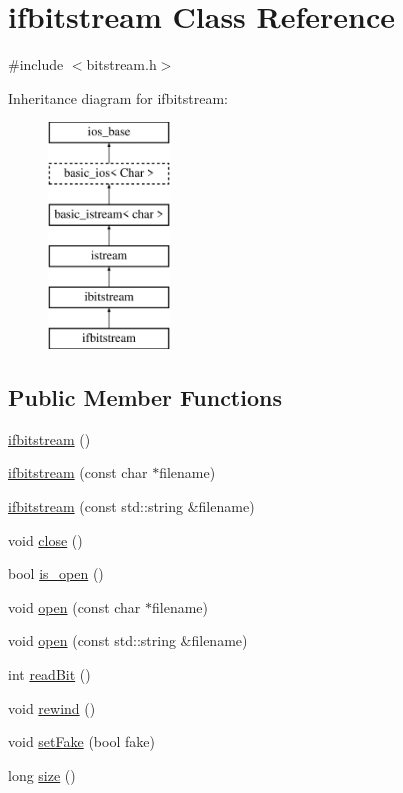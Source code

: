 \hypertarget{classifbitstream}{}\section{ifbitstream Class Reference}
\label{classifbitstream}


{\ttfamily \#include $<$bitstream.\+h$>$}

Inheritance diagram for ifbitstream\+:\begin{figure}[H]
\begin{center}
\leavevmode
\includegraphics[height=6.000000cm]{classifbitstream}
\end{center}
\end{figure}
\subsection*{Public Member Functions}
\begin{DoxyCompactItemize}
\item 
\mbox{\hyperlink{classifbitstream_a2d6148d42c4e6bcac770d185b25a691e}{ifbitstream}} ()
\item 
\mbox{\hyperlink{classifbitstream_a5fe2eb72a345e67256791c172a29bbba}{ifbitstream}} (const char $\ast$filename)
\item 
\mbox{\hyperlink{classifbitstream_a96869868971e5d55945f1ab3d8bde584}{ifbitstream}} (const std\+::string \&filename)
\item 
void \mbox{\hyperlink{classifbitstream_a5ae591df94fc66ccb85cbb6565368bca}{close}} ()
\item 
bool \mbox{\hyperlink{classifbitstream_a2f57f54d8c03b615bb31eee091d8a88a}{is\+\_\+open}} ()
\item 
void \mbox{\hyperlink{classifbitstream_a57f80da790b202b27353cd8f8415b382}{open}} (const char $\ast$filename)
\item 
void \mbox{\hyperlink{classifbitstream_a72f6f3d1b9bc5a4275359cc0a83a60bd}{open}} (const std\+::string \&filename)
\item 
int \mbox{\hyperlink{classibitstream_aa8c615fa7957fb0232a0873dadbd39e8}{read\+Bit}} ()
\item 
void \mbox{\hyperlink{classibitstream_ab8734e666421c9fe3b6380a818c6c727}{rewind}} ()
\item 
void \mbox{\hyperlink{classibitstream_ad916b4624eb09d375514964f867b475c}{set\+Fake}} (bool fake)
\item 
long \mbox{\hyperlink{classibitstream_a22727e9c338fb1aaa6722031445373c3}{size}} ()
\end{DoxyCompactItemize}


